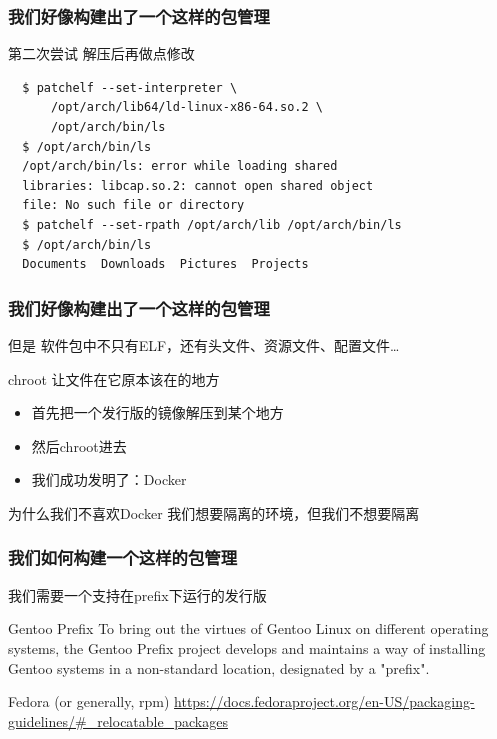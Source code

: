 \documentclass{ctexbeamer}
\begin{document}
\begin{frame}[fragile]
  \frametitle{我们好像构建出了一个这样的包管理}
  \begin{block}{第二次尝试}
    解压后再做点修改
  \end{block}
  \begin{small}
  \begin{verbatim}
  $ patchelf --set-interpreter \
      /opt/arch/lib64/ld-linux-x86-64.so.2 \
      /opt/arch/bin/ls
  $ /opt/arch/bin/ls
  /opt/arch/bin/ls: error while loading shared
  libraries: libcap.so.2: cannot open shared object
  file: No such file or directory
  $ patchelf --set-rpath /opt/arch/lib /opt/arch/bin/ls
  $ /opt/arch/bin/ls
  Documents  Downloads  Pictures  Projects
  \end{verbatim}
  \end{small}
\end{frame}

\begin{frame}
  \frametitle{我们好像构建出了一个这样的包管理}
  \begin{alertblock}{但是}
    软件包中不只有ELF，还有头文件、资源文件、配置文件\dots
  \end{alertblock}
  \begin{exampleblock}{chroot}
    让文件在它原本该在的地方
  \end{exampleblock}
  \begin{itemize}
    \item 首先把一个发行版的镜像解压到某个地方
    \item 然后chroot进去
    \item 我们成功发明了：Docker
  \end{itemize}
  \begin{block}{为什么我们不喜欢Docker}
    我们想要隔离的环境，但我们不想要隔离
  \end{block}
\end{frame}

\begin{frame}
  \frametitle{我们如何构建一个这样的包管理}
  我们需要一个支持在prefix下运行的发行版
  \begin{exampleblock}{Gentoo Prefix}
    To bring out the virtues of Gentoo Linux on different operating systems, the Gentoo Prefix project develops and maintains a way of installing Gentoo systems in a non-standard location, designated by a "prefix".
  \end{exampleblock}
  \begin{block}{Fedora (or generally, rpm)}
    \url{https://docs.fedoraproject.org/en-US/packaging-guidelines/\#\_relocatable_packages}
  \end{block}
\end{frame}
\end{document}
